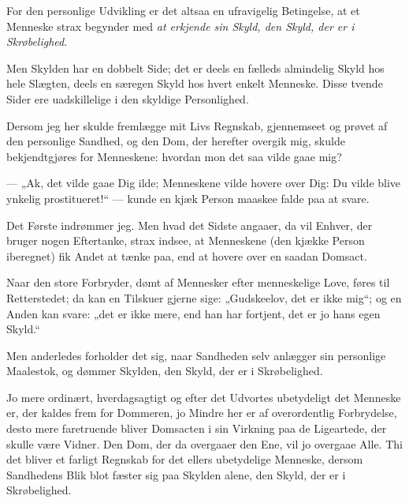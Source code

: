 \documentclass[12pt,a4paper]{book}
\newcommand{\apage}[1]{\marginnote{\footnotesize\textit{[#1]}}}
\begin{document}
For den personlige Udvikling er det altsaa en ufravigelig Betingelse, at
et Menneske strax begynder med \emph{at erkjende sin Skyld, den Skyld,
der er i Skrøbelighed}.

Men Skylden har en dobbelt Side; det er deels en fælleds almindelig Skyld
hos hele Slægten, deels en særegen Skyld hos hvert enkelt Menneske. Disse
tvende Sider ere uadskillelige i den skyldige Personlighed.

Dersom jeg her skulde fremlægge mit Livs Regnskab, gjennemseet og prøvet
af den personlige Sandhed, og den Dom, der herefter overgik mig, skulde
bekjendtgjøres for Menneskene: hvordan mon det saa vilde gaae mig?

--- „Ak, det vilde gaae Dig ilde; Menneskene vilde hovere over Dig: Du
vilde blive ynkelig prostitueret!“ --- kunde en kjæk Person maaskee falde
paa at svare.

Det Første indrømmer jeg. Men hvad det Sidste angaaer, da vil Enhver, der
bruger nogen Eftertanke, strax indsee, at Menneskene (den kjække Person
iberegnet) fik Andet at tænke paa, end at hovere over en saadan Domsact.
 \apage{96}

Naar den store Forbryder, dømt af Mennesker efter menneskelige Love,
føres til Retterstedet; da kan en Tilskuer gjerne sige: „Gudskeelov, det
er ikke mig“; og en Anden kan svare: „det er ikke mere, end han har
fortjent, det er jo hans egen Skyld.“

Men anderledes forholder det sig, naar Sandheden selv anlægger sin
personlige Maalestok, og dømmer Skylden, den Skyld, der er i Skrøbelighed.

Jo mere ordinært, hverdagsagtigt og efter det Udvortes ubetydeligt det
Menneske er, der kaldes frem for Dommeren, jo Mindre her er af
overordentlig Forbrydelse, desto mere faretruende bliver Domsacten i sin
Virkning paa de Ligeartede, der skulle være Vidner. Den Dom, der da
overgaaer den Ene, vil jo overgaae Alle. Thi det bliver et farligt
Regnskab for det ellers ubetydelige Menneske, dersom Sandhedens Blik blot
fæster sig paa Skylden alene, den Skyld, der er i Skrøbelighed.
\end{document}
